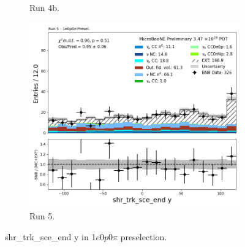 \begin{figure}[H]
\begin{subfigure}[t]{0.32\linewidth}
        \caption{Run 4b.}
    \end{subfigure}%
    \hspace{0.2cm}%
    \begin{subfigure}[t]{0.32\linewidth}
        \includegraphics[width=\linewidth]{technote/Appendix_Preselection/Figures/1e0p0pi/Run5/shr_trk_sce_end_y_Run5_1e0p0pi_Presel.png}
        \caption{Run 5.}
    \end{subfigure}
    \caption{shr\_trk\_sce\_end y in 1$e$0$p$0$\pi$ preselection.}
\end{figure}

